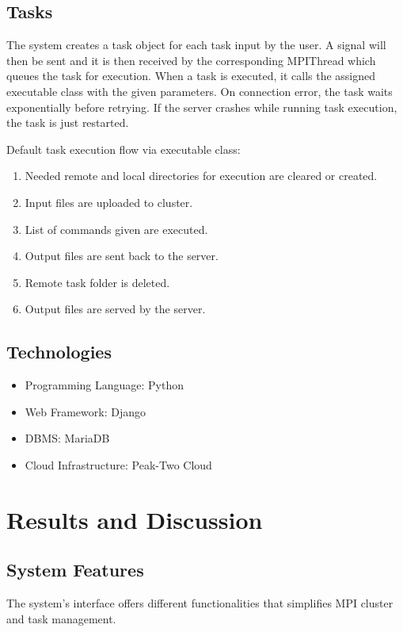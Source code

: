 \subsection{Tasks} 
The system creates a task object for each task input by the user. A signal will then be sent and it is then received by the corresponding MPIThread which queues the task for execution. When a task is executed, it calls the assigned executable class with the given parameters. On connection error, the task waits exponentially before retrying. If the server crashes while running task execution, the task is just restarted.				
		
Default task execution flow via executable class:			
	\begin{enumerate}
		\item  Needed remote and local directories for execution are cleared or created.
		\item  Input files are uploaded to cluster.
		\item  List of commands given are executed.
		\item  Output files are sent back to the server.
		\item  Remote task folder is deleted.
		\item  Output files are served by the server.
	\end{enumerate}	

	
\subsection{Technologies}
	\begin{itemize}
   		\item Programming Language: Python 
   		\item Web Framework: Django  
   		\item DBMS: MariaDB  
   		\item Cloud Infrastructure: Peak-Two Cloud 
	\end{itemize}	
	
\section{Results and Discussion}


          
\subsection{System Features}
The system's interface offers different functionalities that simplifies MPI cluster and task management.
		
